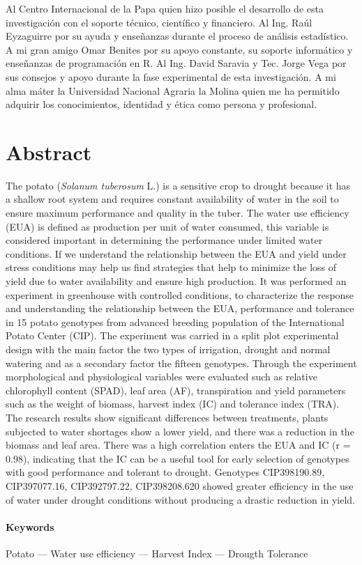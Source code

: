 \documentclass[fleqn,10pt]{Flavio}\usepackage[]{graphicx}\usepackage[]{color}
\begin{document}
Al Centro Internacional de la Papa quien hizo posible el desarrollo de esta investigaci\'on con el soporte t\'ecnico, cient\'ifico y financiero. Al Ing. Ra\'ul Eyzaguirre por su ayuda y ense\~nanzas durante el proceso de an\'alisis estad\'istico. A mi gran amigo Omar Benites por su apoyo constante, su soporte inform\'atico y ense\~nanzas de programaci\'on en R. Al Ing. David Saravia y Tec. Jorge Vega por sus consejos y apoyo durante la fase experimental de esta investigaci\'on. A mi alma m\'ater la Universidad Nacional Agraria la Molina quien me ha permitido adquirir los conocimientos, identidad y \'etica como persona y profesional.




\newpage
\onecolumn
\section*{Abstract}

The potato (\emph{Solanum tuberosum} L.) is a sensitive crop to drought because it has a shallow root system and requires constant availability of water in the soil to ensure maximum performance and quality in the tuber. The water use efficiency (EUA) is defined as production per unit of water consumed, this variable is considered important in determining the performance under limited water conditions. If we understand the relationship between the EUA and yield under stress conditions may help us find strategies that help to minimize the loss of yield due to water availability and ensure high production. It was performed an experiment in greenhouse with controlled conditions, to characterize the response and understanding the relationship between the EUA, performance and tolerance in 15 potato genotypes from advanced breeding population of the International Potato Center (CIP). The experiment was carried in a split plot experimental design with the main factor the two types of irrigation, drought and normal watering and as a secondary factor the fifteen genotypes. Through the experiment morphological and physiological variables were evaluated  such as relative chlorophyll content (SPAD), leaf area (AF), transpiration and yield parameters such as the weight of biomass, harvest index (IC) and tolerance index (TRA). The research results show significant differences between treatments, plants subjected to water shortages show a lower yield, and there was a reduction in the biomass and leaf area. There was a high correlation enters the EUA and IC (r = 0.98), indicating that the IC can be a useful tool for early selection of genotypes with good performance and tolerant to drought. Genotypes CIP398190.89, CIP397077.16, CIP392797.22, CIP398208.620 showed greater efficiency in the use of water under drought conditions without producing a drastic reduction in yield.

\paragraph{Keywords} Potato ---  Water use efficiency ---  Harvest Index ---  Drougth Tolerance
\end{document}
